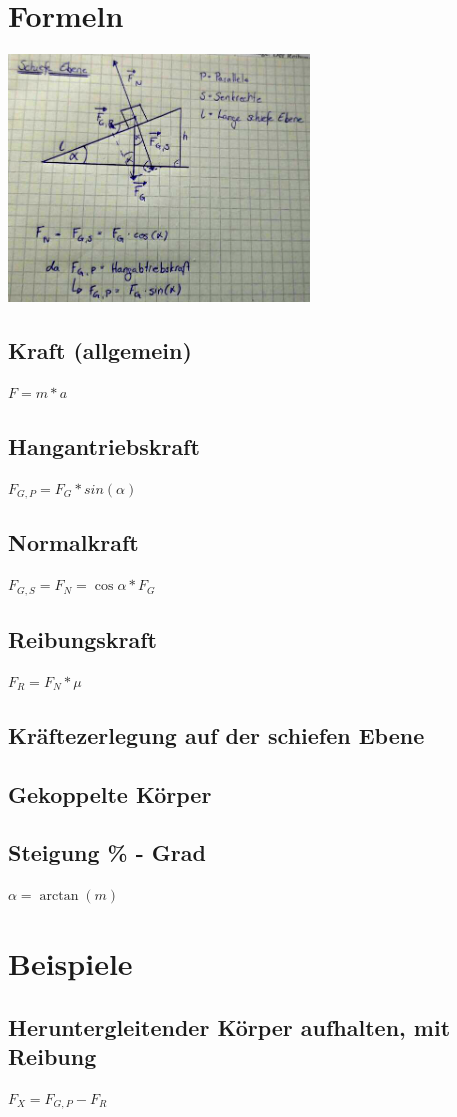 \documentclass[11pt,twoside,a4paper]{article}
\title{\titleText}
\author{\authorText}
\date{\dateText}
\begin{document}
	\maketitle
	
	\section{Formeln}
	\includegraphics[width=8cm]{se1a}
	
	\begin{multicols}{2}
		\subsection{Kraft (allgemein)}
		\(F = m * a\)
		\subsection{Hangantriebskraft}
		\(F_{G,P} = F_G * sin(\alpha)\)
		\subsection{Normalkraft}
		\(F_{G,S} = F_N = \cos\alpha*F_G\)
		\subsection{Reibungskraft}
		\(F_R = F_N * \mu\)
		\subsection{Kräftezerlegung auf der schiefen Ebene}
		\subsection{Gekoppelte Körper}
		\subsection{Steigung \% - Grad}
		\(\alpha = \arctan(m) \)
	\end{multicols}
	
	\section{Beispiele}
	
	\subsection{Heruntergleitender Körper aufhalten, mit Reibung}
	
	\(F_X = F_{G,P} - F_R \)
	
\end{document}

